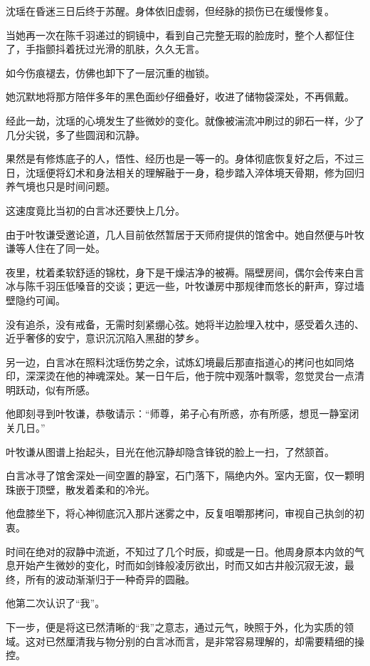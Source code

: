 沈瑶在昏迷三日后终于苏醒。身体依旧虚弱，但经脉的损伤已在缓慢修复。

当她再一次在陈千羽递过的铜镜中，看到自己完整无瑕的脸庞时，整个人都怔住了，手指颤抖着抚过光滑的肌肤，久久无言。

如今伤痕褪去，仿佛也卸下了一层沉重的枷锁。

她沉默地将那方陪伴多年的黑色面纱仔细叠好，收进了储物袋深处，不再佩戴。

\vspace{2em}

经此一劫，沈瑶的心境发生了些微妙的变化。就像被湍流冲刷过的卵石一样，少了几分尖锐，多了些圆润和沉静。

果然是有修炼底子的人，悟性、经历也是一等一的。身体彻底恢复好之后，不过三日，沈瑶便将幻术和身法相关的理解融于一身，稳步踏入淬体境天骨期，修为回归养气境也只是时间问题。

这速度竟比当初的白言冰还要快上几分。

由于叶牧谦受邀论道，几人目前依然暂居于天师府提供的馆舍中。她自然便与叶牧谦等人住在了同一处。

夜里，枕着柔软舒适的锦枕，身下是干燥洁净的被褥。隔壁房间，偶尔会传来白言冰与陈千羽压低嗓音的交谈；更远一些，叶牧谦房中那规律而悠长的鼾声，穿过墙壁隐约可闻。

没有追杀，没有戒备，无需时刻紧绷心弦。她将半边脸埋入枕中，感受着久违的、近乎奢侈的安宁，意识沉沉陷入黑甜的梦乡。

\vspace{2em}

另一边，白言冰在照料沈瑶伤势之余，试炼幻境最后那直指道心的拷问也如同烙印，深深烫在他的神魂深处。某一日午后，他于院中观落叶飘零，忽觉灵台一点清明跃动，似有所感。

他即刻寻到叶牧谦，恭敬请示：“师尊，弟子心有所惑，亦有所感，想觅一静室闭关几日。”

叶牧谦从图谱上抬起头，目光在他沉静却隐含锋锐的脸上一扫，了然颔首。

白言冰寻了馆舍深处一间空置的静室，石门落下，隔绝内外。室内无窗，仅一颗明珠嵌于顶壁，散发着柔和的冷光。

他盘膝坐下，将心神彻底沉入那片迷雾之中，反复咀嚼那拷问，审视自己执剑的初衷。

时间在绝对的寂静中流逝，不知过了几个时辰，抑或是一日。他周身原本内敛的气息开始产生微妙的变化，时而如剑锋般凌厉欲出，时而又如古井般沉寂无波，最终，所有的波动渐渐归于一种奇异的圆融。

他第二次认识了“我”。

下一步，便是将这已然清晰的“我”之意志，通过元气，映照于外，化为实质的领域。这对已然厘清我与物分别的白言冰而言，是非常容易理解的，却需要精细的操控。

